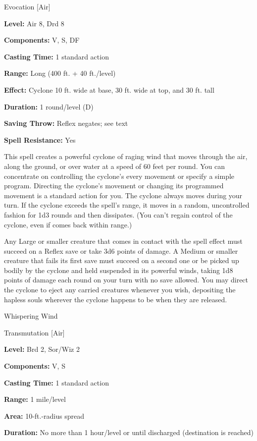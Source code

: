 \documentclass{article}
\begin{document}
Evocation [Air]

\textbf{Level:} Air 8, Drd 8

\textbf{Components:} V, S, DF

\textbf{Casting Time:} 1 standard action

\textbf{Range:} Long (400 ft. + 40 ft./level)

\textbf{Effect:} Cyclone 10 ft. wide at base, 30 ft. wide at top, and 30 ft. tall

\textbf{Duration:} 1 round/level (D)

\textbf{Saving Throw:} Reflex negates; see text

\textbf{Spell Resistance:} Yes

This spell creates a powerful cyclone of raging wind that moves through the air, 
along the ground, or over water at a speed of 60 feet per round. You can concentrate 
on controlling the cyclone's every movement or specify a simple program. Directing 
the cyclone's movement or changing its programmed movement is a standard action 
for you. The cyclone always moves during your turn. If the cyclone exceeds the 
spell's range, it moves in a random, uncontrolled fashion for 1d3 rounds and then 
dissipates. (You can't regain control of the cyclone, even if comes back within 
range.)

Any Large or smaller creature that comes in contact with the spell effect must 
succeed on a Reflex save or take 3d6 points of damage. A Medium or smaller creature 
that fails its first save must succeed on a second one or be picked up bodily by 
the cyclone and held suspended in its powerful winds, taking 1d8 points of damage 
each round on your turn with no save allowed. You may direct the cyclone to eject 
any carried creatures whenever you wish, depositing the hapless souls wherever 
the cyclone happens to be when they are released.

\vspace{12pt}
Whispering Wind

Transmutation [Air]

\textbf{Level:} Brd 2, Sor/Wiz 2

\textbf{Components:} V, S

\textbf{Casting Time:} 1 standard action

\textbf{Range:} 1 mile/level

\textbf{Area:} 10-ft.-radius spread

\textbf{Duration:} No more than 1 hour/level or until discharged (destination is 
reached)
\end{document}
